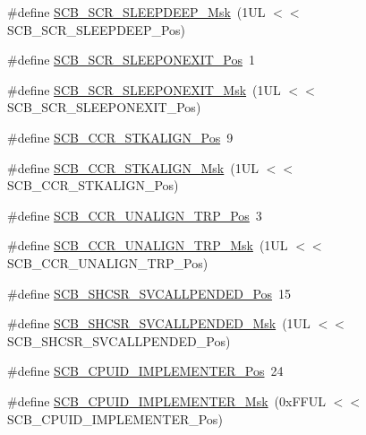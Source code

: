 \begin{DoxyCompactItemize}
\#define \mbox{\hyperlink{group___c_m_s_i_s___s_c_b_ga77c06a69c63f4b3f6ec1032e911e18e7}{S\+C\+B\+\_\+\+S\+C\+R\+\_\+\+S\+L\+E\+E\+P\+D\+E\+E\+P\+\_\+\+Msk}}~(1\+U\+L $<$$<$ S\+C\+B\+\_\+\+S\+C\+R\+\_\+\+S\+L\+E\+E\+P\+D\+E\+E\+P\+\_\+\+Pos)
\item 
\#define \mbox{\hyperlink{group___c_m_s_i_s___s_c_b_ga3680a15114d7fdc1e25043b881308fe9}{S\+C\+B\+\_\+\+S\+C\+R\+\_\+\+S\+L\+E\+E\+P\+O\+N\+E\+X\+I\+T\+\_\+\+Pos}}~1
\item 
\#define \mbox{\hyperlink{group___c_m_s_i_s___s_c_b_ga50a243e317b9a70781b02758d45b05ee}{S\+C\+B\+\_\+\+S\+C\+R\+\_\+\+S\+L\+E\+E\+P\+O\+N\+E\+X\+I\+T\+\_\+\+Msk}}~(1\+U\+L $<$$<$ S\+C\+B\+\_\+\+S\+C\+R\+\_\+\+S\+L\+E\+E\+P\+O\+N\+E\+X\+I\+T\+\_\+\+Pos)
\item 
\#define \mbox{\hyperlink{group___c_m_s_i_s___s_c_b_gac2d20a250960a432cc74da59d20e2f86}{S\+C\+B\+\_\+\+C\+C\+R\+\_\+\+S\+T\+K\+A\+L\+I\+G\+N\+\_\+\+Pos}}~9
\item 
\#define \mbox{\hyperlink{group___c_m_s_i_s___s_c_b_ga33cf22d3d46af158a03aad25ddea1bcb}{S\+C\+B\+\_\+\+C\+C\+R\+\_\+\+S\+T\+K\+A\+L\+I\+G\+N\+\_\+\+Msk}}~(1\+U\+L $<$$<$ S\+C\+B\+\_\+\+C\+C\+R\+\_\+\+S\+T\+K\+A\+L\+I\+G\+N\+\_\+\+Pos)
\item 
\#define \mbox{\hyperlink{group___c_m_s_i_s___s_c_b_gac4e4928b864ea10fc24dbbc57d976229}{S\+C\+B\+\_\+\+C\+C\+R\+\_\+\+U\+N\+A\+L\+I\+G\+N\+\_\+\+T\+R\+P\+\_\+\+Pos}}~3
\item 
\#define \mbox{\hyperlink{group___c_m_s_i_s___s_c_b_ga68c96ad594af70c007923979085c99e0}{S\+C\+B\+\_\+\+C\+C\+R\+\_\+\+U\+N\+A\+L\+I\+G\+N\+\_\+\+T\+R\+P\+\_\+\+Msk}}~(1\+U\+L $<$$<$ S\+C\+B\+\_\+\+C\+C\+R\+\_\+\+U\+N\+A\+L\+I\+G\+N\+\_\+\+T\+R\+P\+\_\+\+Pos)
\item 
\#define \mbox{\hyperlink{group___c_m_s_i_s___s_c_b_ga2f93ec9b243f94cdd3e94b8f0bf43641}{S\+C\+B\+\_\+\+S\+H\+C\+S\+R\+\_\+\+S\+V\+C\+A\+L\+L\+P\+E\+N\+D\+E\+D\+\_\+\+Pos}}~15
\item 
\#define \mbox{\hyperlink{group___c_m_s_i_s___s_c_b_ga6095a7acfbad66f52822b1392be88652}{S\+C\+B\+\_\+\+S\+H\+C\+S\+R\+\_\+\+S\+V\+C\+A\+L\+L\+P\+E\+N\+D\+E\+D\+\_\+\+Msk}}~(1\+U\+L $<$$<$ S\+C\+B\+\_\+\+S\+H\+C\+S\+R\+\_\+\+S\+V\+C\+A\+L\+L\+P\+E\+N\+D\+E\+D\+\_\+\+Pos)
\item 
\#define \mbox{\hyperlink{group___c_m_s_i_s___s_c_b_ga58686b88f94f789d4e6f429fe1ff58cf}{S\+C\+B\+\_\+\+C\+P\+U\+I\+D\+\_\+\+I\+M\+P\+L\+E\+M\+E\+N\+T\+E\+R\+\_\+\+Pos}}~24
\item 
\#define \mbox{\hyperlink{group___c_m_s_i_s___s_c_b_ga0932b31faafd47656a03ced75a31d99b}{S\+C\+B\+\_\+\+C\+P\+U\+I\+D\+\_\+\+I\+M\+P\+L\+E\+M\+E\+N\+T\+E\+R\+\_\+\+Msk}}~(0x\+F\+F\+U\+L $<$$<$ S\+C\+B\+\_\+\+C\+P\+U\+I\+D\+\_\+\+I\+M\+P\+L\+E\+M\+E\+N\+T\+E\+R\+\_\+\+Pos)

\end{DoxyCompactItemize}
